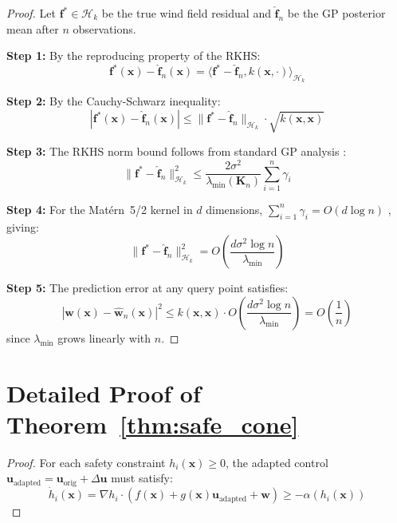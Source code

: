 \documentclass[12pt,a4paper,twocolumn]{article}
\newcommand{\cH}{\mathcal{H}}
\newcommand{\vect}[1]{\mathbf{#1}}
\newcommand{\mat}[1]{\mathbf{#1}}
\begin{document}
\begin{enumerate}[leftmargin=*]
\begin{proof}
Let $\vect{f}^* \in \cH_k$ be the true wind field residual and $\hat{\vect{f}}_n$ be the GP posterior mean after $n$ observations.

\textbf{Step 1:} By the reproducing property of the RKHS:
\begin{equation}
    \vect{f}^*(\vect{x}) - \hat{\vect{f}}_n(\vect{x}) = \langle \vect{f}^* - \hat{\vect{f}}_n, k(\vect{x}, \cdot) \rangle_{\cH_k}
\end{equation}

\textbf{Step 2:} By the Cauchy-Schwarz inequality:
\begin{equation}
    |\vect{f}^*(\vect{x}) - \hat{\vect{f}}_n(\vect{x})| \leq \|\vect{f}^* - \hat{\vect{f}}_n\|_{\cH_k} \cdot \sqrt{k(\vect{x}, \vect{x})}
\end{equation}

\textbf{Step 3:} The RKHS norm bound follows from standard GP analysis \citep{Srinivas2010}:
\begin{equation}
    \|\vect{f}^* - \hat{\vect{f}}_n\|^2_{\cH_k} \leq \frac{2\sigma^2}{\lambda_{\min}(\mat{K}_n)} \sum_{i=1}^n \gamma_i
\end{equation}

\textbf{Step 4:} For the Mat\'ern~5/2 kernel in $d$ dimensions, $\sum_{i=1}^n \gamma_i = O(d \log n)$ \citep{Srinivas2010,Krause2008}, giving:
\begin{equation}
    \|\vect{f}^* - \hat{\vect{f}}_n\|^2_{\cH_k} = O\left(\frac{d \sigma^2 \log n}{\lambda_{\min}}\right)
\end{equation}

\textbf{Step 5:} The prediction error at any query point satisfies:
\begin{equation}
    |\vect{w}(\vect{x}) - \hat{\vect{w}}_n(\vect{x})|^2 \leq k(\vect{x}, \vect{x}) \cdot O\left(\frac{d \sigma^2 \log n}{\lambda_{\min}}\right) = O\left(\frac{1}{n}\right)
\end{equation}
since $\lambda_{\min}$ grows linearly with $n$.
\end{proof}

\section{Detailed Proof of Theorem~\ref{thm:safe_cone}}
\label{app:safe_cone_proof}

\begin{proof}
For each safety constraint $h_i(\vect{x}) \geq 0$, the adapted control $\vect{u}_{\text{adapted}} = \vect{u}_{\text{orig}} + \Delta\vect{u}$ must satisfy:
\begin{equation}
    \dot{h}_i(\vect{x}) = \nabla h_i \cdot (f(\vect{x}) + g(\vect{x})\vect{u}_{\text{adapted}} + \vect{w}) \geq -\alpha(h_i(\vect{x}))
\end{equation}


\end{proof}
\end{enumerate}
\end{document}

